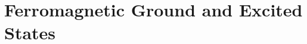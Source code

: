 \documentclass[../main.tex]{subfiles}
\begin{document}
\chapter{Ferromagnetic Ground and Excited States}




\end{document}
